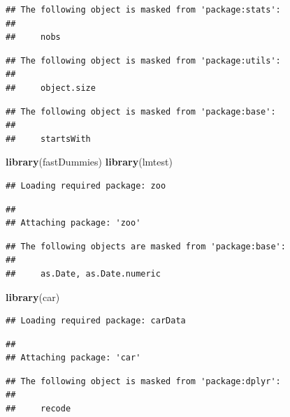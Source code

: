 \documentclass[
]{article}
\newenvironment{Shaded}{\begin{snugshade}}{\end{snugshade}}
\newcommand{\KeywordTok}[1]{\textcolor[rgb]{0.13,0.29,0.53}{\textbf{#1}}}
\newcommand{\NormalTok}[1]{#1}
\begin{document}
\begin{verbatim}
## The following object is masked from 'package:stats':
## 
##     nobs
\end{verbatim}

\begin{verbatim}
## The following object is masked from 'package:utils':
## 
##     object.size
\end{verbatim}

\begin{verbatim}
## The following object is masked from 'package:base':
## 
##     startsWith
\end{verbatim}

\begin{Shaded}
\begin{Highlighting}[]
\KeywordTok{library}\NormalTok{(fastDummies)}
\KeywordTok{library}\NormalTok{(lmtest)}
\end{Highlighting}
\end{Shaded}

\begin{verbatim}
## Loading required package: zoo
\end{verbatim}

\begin{verbatim}
## 
## Attaching package: 'zoo'
\end{verbatim}

\begin{verbatim}
## The following objects are masked from 'package:base':
## 
##     as.Date, as.Date.numeric
\end{verbatim}

\begin{Shaded}
\begin{Highlighting}[]
\KeywordTok{library}\NormalTok{(car)}
\end{Highlighting}
\end{Shaded}

\begin{verbatim}
## Loading required package: carData
\end{verbatim}

\begin{verbatim}
## 
## Attaching package: 'car'
\end{verbatim}

\begin{verbatim}
## The following object is masked from 'package:dplyr':
## 
##     recode
\end{verbatim}
\end{document}
